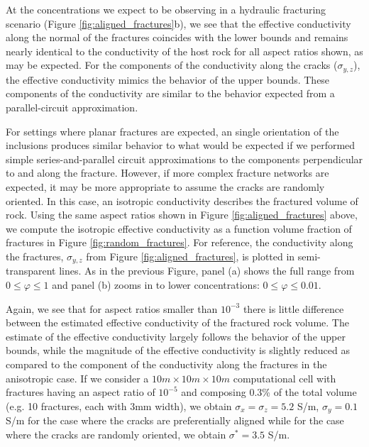 At the concentrations we expect to be observing in a hydraulic fracturing scenario (Figure \ref{fig:aligned_fractures}b), we see that the effective conductivity along the normal of the fractures coincides with the lower bounds and remains nearly identical to the conductivity of the host rock for all aspect ratios shown, as may be expected. For the components of the conductivity along the cracks ($\sigma_{y, z}$), the effective conductivity mimics the behavior of the upper bounds. These components of the conductivity are similar to the behavior expected from a parallel-circuit approximation.

For settings where planar fractures are expected, an single orientation of the inclusions produces similar behavior to what would be expected if we performed simple series-and-parallel circuit approximations to the components perpendicular to and along the fracture. However, if more complex fracture networks are expected, it may be more appropriate to assume the cracks are randomly oriented. In this case, an isotropic conductivity describes the fractured volume of rock. Using the same aspect ratios shown in Figure \ref{fig:aligned_fractures} above, we compute the isotropic effective conductivity as a function volume fraction of fractures in Figure \ref{fig:random_fractures}. For reference, the conductivity along the fractures, $\sigma_{y, z}$ from Figure \ref{fig:aligned_fractures}, is plotted in semi-transparent lines. As in the previous Figure, panel (a) shows the full range from $0 \leq \varphi \leq 1$ and panel (b) zooms in to lower concentrations: $0 \leq \varphi \leq 0.01$.



Again, we see that for aspect ratios smaller than $10^{-3}$ there is little difference between the estimated effective conductivity of the fractured rock volume. The estimate of the effective conductivity largely follows the behavior of the upper bounds, while the magnitude of the effective conductivity is slightly reduced as compared to the component of the conductivity along the fractures in the anisotropic case. If we consider a $10m \times 10m \times 10m$ computational cell with fractures having an aspect ratio of $10^{-5}$ and composing 0.3\% of the total volume (e.g. 10 fractures, each with 3mm width), we obtain $\sigma_x = \sigma_z = 5.2$ S/m, $\sigma_y = 0.1$ S/m for the case where the cracks are preferentially aligned while for the case where the cracks are randomly oriented, we obtain $\sigma^* = 3.5$ S/m.

